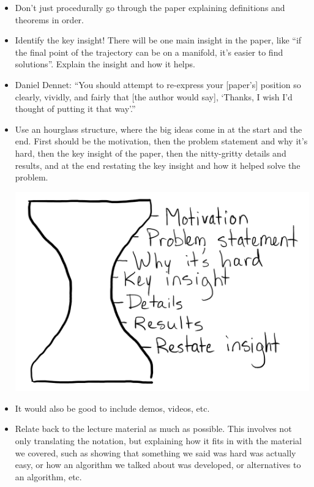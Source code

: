 \documentclass[twoside]{article}
\begin{document}
\begin{itemize}
\item Don't just procedurally go through the paper explaining definitions and theorems in order.
\item Identify the key insight! There will be one main insight in the paper, like ``if the final point of the trajectory can be on a manifold, it's easier to find solutions''. Explain the insight and how it helps.
\item Daniel Dennet: ``You should attempt to re-express your [paper's] position so clearly, vividly, and fairly that [the author would say], `Thanks, I wish I'd thought of putting it that way'.''
\item Use an hourglass structure, where the big ideas come in at the start and the end. First should be the motivation, then the problem statement and why it's hard, then the key insight of the paper, then the nitty-gritty details and results, and at the end restating the key insight and how it helped solve the problem.
\begin{center}
\includegraphics[scale=0.3]{figures/hourglass.png}
\end{center}
\item It would also be good to include demos, videos, etc.
\item Relate back to the lecture material as much as possible. This involves not only translating the notation, but explaining how it fits in with the material we covered, such as showing that something we said was hard was actually easy, or how an algorithm we talked about was developed, or alternatives to an algorithm, etc.
\end{itemize}
\end{document}
